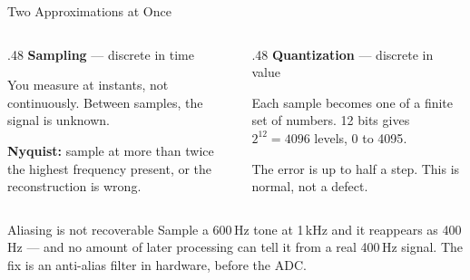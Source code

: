 \documentclass[9pt,aspectratio=169,xcolor=table]{beamer}
\begin{document}
\begin{frame}{Two Approximations at Once}
    \begin{columns}[T]
    \begin{column}{.48\textwidth}
        \textbf{Sampling} --- discrete in \alert{time}

        \vspace{1mm}
        {\small You measure at instants, not continuously. Between samples, the
        signal is unknown.}

        \vspace{2mm}
        {\small \textbf{Nyquist:} sample at more than \alert{twice} the highest
        frequency present, or the reconstruction is wrong.}
    \end{column}
    \begin{column}{.48\textwidth}
        \textbf{Quantization} --- discrete in \alert{value}

        \vspace{1mm}
        {\small Each sample becomes one of a finite set of numbers. 12 bits gives
        $2^{12} = 4096$ levels, \alert{0 to 4095}.}

        \vspace{2mm}
        {\small The error is up to half a step. This is normal, not a defect.}
    \end{column}
    \end{columns}

    \vspace{3mm}
    \begin{block}{Aliasing is not recoverable}
        Sample a 600\,Hz tone at 1\,kHz and it reappears as 400\,Hz --- and no
        amount of later processing can tell it from a real 400\,Hz signal. The
        fix is an \alert{anti-alias filter in hardware}, before the ADC.
    \end{block}
\end{frame}
\end{document}
